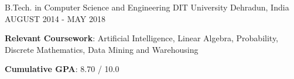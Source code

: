\begin{cventries}
  \cventry
    {B.Tech. in Computer Science and Engineering}
    {DIT University}
    {Dehradun, India}
    {AUGUST 2014 - MAY 2018}
    {
      \begin{cvitems}
        \item {\textbf{Relevant Coursework}: Artificial Intelligence, Linear Algebra, Probability, Discrete Mathematics, Data Mining and Warehousing
}
\item {\textbf{Cumulative GPA}: 8.70 / 10.0
}
      \end{cvitems}
    }
\end{cventries}
